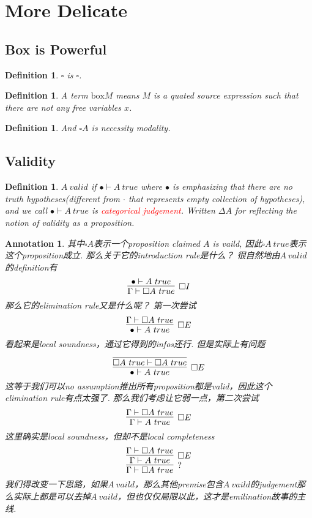 \documentclass{article}
\theoremstyle{plain}
\newtheorem{definition}[theorem]{Definition}
\newtheorem{annotation}[theorem]{Annotation}
\theoremstyle{nonumberplain}
\newcommand{\redt}[1]{\textcolor{red}{#1}}
\begin{document}
\newpage
\section{More Delicate}
\subsection{Box is Powerful}

\begin{definition}
\rm $\square$ is $\square$. 
\end{definition}


\begin{definition}
\rm A term $\text{box} M$ means $M$ is a quated source expression such that there are not any free variables $x$. 
\end{definition}


\begin{definition}
\rm And $\square A$ is necessity modality. 
\end{definition}


\subsection{Validity}

\begin{definition}
\rm $A~valid$ if $\bullet \vdash A~true$ where $\bullet$ is emphasizing that there are no truth hypotheses(different from $\cdot$ that represents empty collection of hypotheses), and we call $\bullet \vdash A~true$ is \redt{categorical judgement}. Written $\Delta A$ for reflecting the notion of validity as a proposition. 
\end{definition}

\begin{annotation}
\rm 其中$\square A$表示一个proposition claimed $A$ is vaild, 因此$\square A ~true$表示这个proposition成立. 那么关于它的introduction rule是什么？ 很自然地由$A ~ valid$的definition有
$$
\infer[\square I]{\Gamma \vdash \square A~true}{\bullet \vdash A~true}
$$
那么它的elimination rule又是什么呢？ 第一次尝试
$$
\infer[\square E]{\bullet \vdash A~true}{\Gamma \vdash \square A~true}
$$
看起来是local soundness，通过它得到的infos还行. 但是实际上有问题
$$
\infer[\square E]{\bullet \vdash A~true}{\infer{\square A~true \vdash \square A~true}{}}
$$
这等于我们可以no assumption推出所有proposition都是valid，因此这个elimination rule有点太强了. 那么我们考虑让它弱一点，第二次尝试
$$
\infer[\square E]{\Gamma \vdash A~true}{\Gamma \vdash \square A~true}
$$
这里确实是local soundness，但却不是local completeness
$$
\infer[?]{\Gamma \vdash \square A~true}{\infer[\square E]{\Gamma \vdash A~true}{\Gamma \vdash \square A~true}}
$$
我们得改变一下思路，如果$A~vaild$，那么其他premise包含$A~vaild$的judgement那么实际上都是可以去掉$A~vaild$，但也仅仅局限以此，这才是emilination故事的主线. 
\end{annotation}
\end{document}
